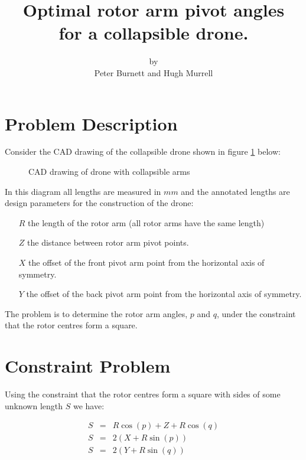 \documentclass[11pt]{article}
\begin{document}
\title{Optimal rotor arm pivot angles \\ for a collapsible drone.}
\author{ by \\ Peter Burnett and Hugh Murrell }
\maketitle

\newpage
\section*{Problem Description}

Consider the CAD drawing of the collapsible drone shown in figure \ref{fig1} below:

\begin{figure}[H]
\begin{center}
\end{center}
\caption{CAD drawing of drone with collapsible arms}  
\label{fig1}
\end{figure}

In this diagram all lengths are measured in $mm$ and the annotated lengths 
are design parameters for the construction of the drone:

\begin{itemize}
\item[$R$] the length of the rotor arm (all rotor arms have the same length)
\item[$Z$] the distance between rotor arm pivot points.
\item[$X$] the offset of the front pivot arm point from the horizontal axis of symmetry.
\item[$Y$] the offset of the back pivot arm point from the horizontal axis of symmetry.
\end{itemize}

The problem is to determine the rotor arm angles, $p$ and $q$, under the
constraint that the rotor centres form a square.

\section*{Constraint Problem}

Using the constraint that the rotor centres form a square with sides of some unknown length $S$
we have:

\begin{eqnarray}
S & = & R \cos(p) + Z + R \cos(q)    \nonumber \\
S & = & 2 ( X + R \sin(p) )  \nonumber  \\
S & = & 2 ( Y + R \sin(q) )  \label{eqn1}
\end{eqnarray}
\end{document}
